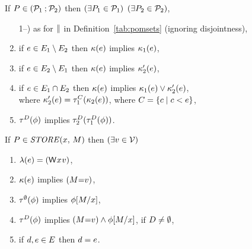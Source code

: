 \begin{definition}
  \noindent
  If $\aPS\SB0 \in (\aPSS_1\sSEMI\aPSS_2)$ then
  $(\exists\aPS_1\in\aPSS_1)$ $(\exists\aPS_2\in\aPSS_2)$,
  \begin{enumerate}
  \setcounter{enumi}{\value{pomsetParCount}}
  \item[1--\thepomsetParCount)] as for $\sPAR$  in
    Definition~\ref{tab:pomsets} (ignoring disjointness),
  \item if $\aEv\in\aEvs_1\setminus\aEvs_2$ then $\labelingForm\SB0(\aEv)$ implies $\labelingForm_1(\aEv)$,
  \item if $\aEv\in\aEvs_2\setminus\aEvs_1$ then $\labelingForm\SB0(\aEv)$ implies $\labelingForm'_2(\aEv)$,
  \item if $\aEv\in\aEvs_1\cap\aEvs_2$ then $\labelingForm\SB0(\aEv)$ implies $\labelingForm_1(\aEv)\lor\labelingForm'_2(\aEv)$,
  \\ where $\labelingForm'_2(\aEv)=\aTr[\cEvs]_1(\labelingForm_2(\aEv))$, where $\cEvs=\{ \cEv \mid \cEv <\SB0 \aEv \}$,
  \item $\aTr[\bEvs]\SB0(\aForm)$ implies $\aTr[\bEvs]_2(\aTr[\bEvs]_1(\aForm))$.
  \end{enumerate}

  \noindent
  If $\aPS\SB0 \in \sSTORE{\aLoc}{\aExp}$ then
  $(\exists\aVal\in\Val)$
  \begin{enumerate}
  \item $\labelingAct\SB0(\aEv) = \DWP{\aLoc}{\aVal}$,
  \item $\labelingForm\SB0(\aEv)$ implies $(\aExp{=}\aVal)$,
  \item %
    $\aTr[\emptyset]\SB0(\aForm)$ implies $\aForm[\aExp/\aLoc]$,
  \item %
    $\aTr[\bEvs]\SB0(\aForm)$ implies $(\aExp{=}\aVal) \land \aForm[\aExp/\aLoc]$, if $\bEvs\neq\emptyset$,
  \item if $\bEv,\aEv\in\aEvs\SB0$ then $\bEv=\aEv$.
  \end{enumerate}


\end{definition}
